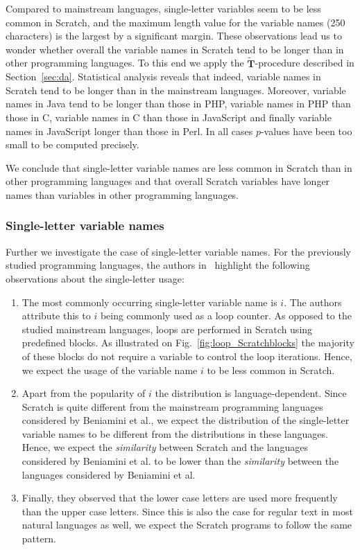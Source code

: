 \documentclass[conference]{IEEEtran}
\begin{document}
Compared to mainstream languages, single-letter variables seem to be less common in Scratch, and the maximum length value for the variable names (250 characters) is the largest by a significant margin. 
These observations lead us to wonder whether overall the variable names in Scratch tend to be longer than in other programming languages.
To this end we apply the $\widetilde{\mathbf{T}}$-procedure described in Section~\ref{sec:da}. 
Statistical analysis reveals that indeed, variable names in Scratch tend to be longer than in the mainstream languages.
Moreover, variable names in Java tend to be longer than those in PHP, variable names in  PHP than those in C, variable names in C than those in JavaScript and finally variable names in JavaScript longer than those in Perl. In all cases $p$-values have been too small to be computed precisely.

We conclude that single-letter variable names are less common in Scratch than in other programming languages and that overall Scratch variables have longer names than variables in other programming languages.

\subsubsection{Single-letter variable names}
\label{res:var:names}
Further we investigate the case of single-letter variable names. For the previously studied programming languages, the authors in~\cite{Beniamini} highlight the following observations about the single-letter usage: 

\begin{enumerate}[label=\emph{\alph*})]
\item The most commonly occurring single-letter variable name is $i$.
The authors attribute this to $i$ being commonly used as a loop counter. 
As opposed to the studied mainstream languages, loops are performed in Scratch using predefined blocks. 
As illustrated on Fig.~\ref{fig:loop_Scratchblocks} the majority of these blocks do not require a variable to control the loop iterations. 
Hence, we expect the usage of the variable name $i$ to be less common in Scratch. \label{single-letter-vars:i}
\item Apart from the popularity of $i$ the distribution is language-dependent. 
Since Scratch is quite different from the mainstream programming languages considered by Beniamini et al., we expect the distribution of the single-letter variable names to be different from the distributions in these languages. 
Hence, we expect the \emph{similarity} between Scratch and the languages considered by Beniamini et al. to be lower than the \emph{similarity} between the languages considered by Beniamini et al. \label{single-letter-vars:similarity}
\item Finally, they observed that the lower case letters are used more frequently than the upper case letters. Since this is also the case for regular text in most natural languages as well, we expect the Scratch programs to follow the same pattern. \label{single-letter-vars:upercase:lowercase}
\end{enumerate}
\end{document}

